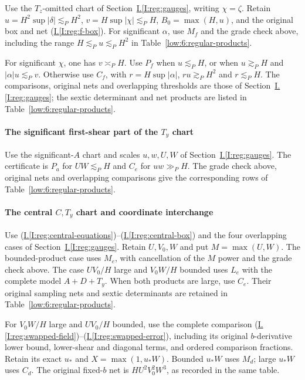 \documentclass[11pt]{amsart}
\theoremstyle{definition}
\theoremstyle{remark}
\numberwithin{equation}{section}
\newcommand{\partIref}[1]{\hyperref[I:#1]{I.\ref*{I:#1}}}
\newcommand{\partIeqref}[1]{\textup{(\partIref{#1})}}
\begin{document}
Use the $T_z$-omitted chart of Section~\partIref{reg:gauges}, writing $\chi=\zeta$. Retain $u=H^2\sup|\delta|\lesssim_PH^2$, $v=H\sup|\chi|\lesssim_PH$, $B_0=\max(H,u)$, and the original box and net \partIeqref{reg:f-box}. For significant $\alpha$, use $M_f$ and the grade check above, including the range $H\lesssim_Pu\lesssim_PH^2$ in Table~\ref{low:6:regular-products}.

For significant $\chi$, one has $v\asymp_PH$. Use $P_f$ when $u\lesssim_PH$, or when $u\gtrsim_PH$ and $|\alpha|u\lesssim_Pv$. Otherwise use $C_f$, with $r=H\sup|\alpha|$, $ru\gtrsim_PH^2$ and $r\lesssim_PH$. The comparisons, original nets and overlapping thresholds are those of Section~\partIref{reg:gauges}; the sextic determinant and net products are listed in Table~\ref{low:6:regular-products}.

\paragraph{The significant first-shear part of the \texorpdfstring{$T_y$}{Ty} chart}

Use the significant-$A$ chart and scales $u,w,U,W$ of Section~\partIref{reg:gauges}. The certificate is $P_a$ for $UW\lesssim_PH$ and $C_e$ for $uw\gg_PH$. The grade check above, original nets and overlapping comparisons give the corresponding rows of Table~\ref{low:6:regular-products}.

\paragraph{The central \texorpdfstring{$C,T_y$}{C,Ty} chart and coordinate interchange}\label{low:6:s6r:central}

Use \partIeqref{reg:central-equations}--\partIeqref{reg:central-box} and the four overlapping cases of Section~\partIref{reg:gauges}. Retain $U,V_0,W$ and put $M=\max(U,W)$. The bounded-product case uses $M_e$, with cancellation of the $M$ power and the grade check above. The case $UV_0/H$ large and $V_0W/H$ bounded uses $L_e$ with the complete model $A+D+T_y$. When both products are large, use $C_e$. Their original sampling nets and sextic determinants are retained in Table~\ref{low:6:regular-products}.

For $V_0W/H$ large and $UV_0/H$ bounded, use the complete comparison \partIeqref{reg:swapped-field}--\partIeqref{reg:swapped-error}, including its original $b$-derivative lower bound, lower-shear and diagonal terms, and ordered comparison fractions. Retain its exact $u_*$ and $X=\max(1,u_*W)$. Bounded $u_*W$ uses $M_d$; large $u_*W$ uses $C_d$. The original fixed-$b$ net is $HU^2V_0^2W^3$, as recorded in the same table.
\end{document}
